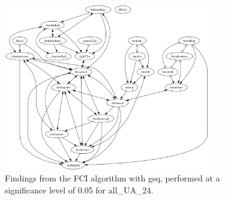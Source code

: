 \begin{figure}[htbp]
    \centering
    \includegraphics[width=0.8\textwidth]{Report/final_report/pictures/FCI_gsq_0.05_all_UA_24.png}
    \caption{Findings from the FCI algorithm with gsq, performed at a significance level of 0.05 for all_UA_24.}
    \label{fig:fci_gsq_0.05all_UA_24}
\end{figure}
